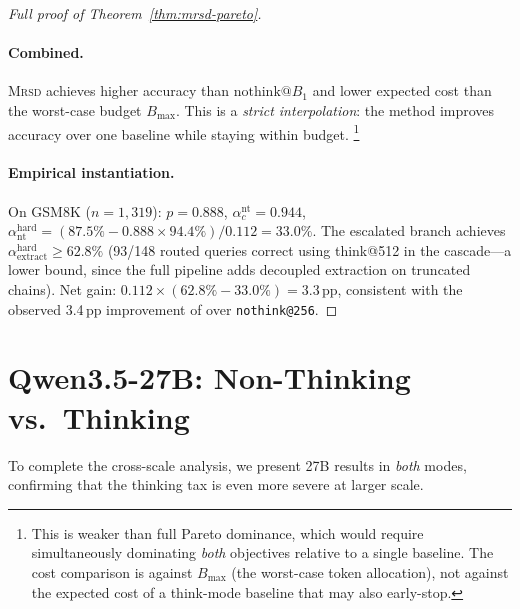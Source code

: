\begin{proof}[Full proof of Theorem~\ref{thm:mrsd-pareto}]
\paragraph{Combined.}
\textsc{Mrsd} achieves higher accuracy than $\mathrm{nothink@}B_1$
and lower expected cost than the worst-case budget $B_{\max}$.
This is a \emph{strict interpolation}: the method improves
accuracy over one baseline while staying within budget.%
\footnote{This is weaker than full Pareto dominance, which would require
simultaneously dominating \emph{both} objectives relative to a single
baseline.
The cost comparison is against $B_{\max}$ (the worst-case token
allocation), not against the expected cost of a think-mode baseline
that may also early-stop.}

\paragraph{Empirical instantiation.}
On GSM8K ($n{=}1{,}319$): $p = 0.888$, $\alpha_c^{\mathrm{nt}} = 0.944$,
$\alpha_{\mathrm{nt}}^{\mathrm{hard}} = (87.5\% - 0.888 \times 94.4\%)/0.112 = 33.0\%$.
The escalated branch achieves
$\alpha_{\mathrm{extract}}^{\mathrm{hard}} \ge 62.8\%$
(93/148 routed queries correct using think@512 in the
\town{} cascade---a lower bound, since the full \method{}
pipeline adds decoupled extraction on truncated chains).
Net gain: $0.112 \times (62.8\% - 33.0\%) = 3.3$\,pp,
consistent with the observed 3.4\,pp improvement of \method{} over
\texttt{nothink@256}.
\end{proof}

\section{Qwen3.5-27B: Non-Thinking vs.\ Thinking}
\label{app:27b-nothink}

To complete the cross-scale analysis, we present 27B results in
\emph{both} modes, confirming that the thinking tax is even more severe
at larger scale.

